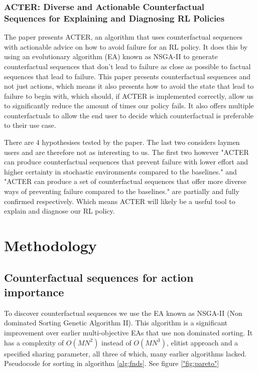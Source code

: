 \documentclass[UKenglish]{uiomasterthesis}
\begin{document}
\subsection{ ACTER: Diverse and Actionable Counterfactual\\ Sequences for Explaining and Diagnosing RL Policies}
\label{sec:acter}
The paper presents ACTER, an algorithm that uses counterfactual sequences with actionable advice on how to avoid failure for an RL policy. It does this by using an evolutionary algorithm (EA) known as NSGA-II to generate counterfactual sequences that don't lead to failure as close as possible to factual sequences that lead to failure. This paper presents counterfactual sequences and not just actions, which means it also presents how to avoid the state that lead to failure to begin with, which should, if ACTER is implemented correctly, allow us to significantly reduce the amount of times our policy fails. It also offers multiple counterfactuals to allow the end user to decide which counterfactual is preferable to their use case.

There are 4 hypothesises tested by the paper. The last two considers laymen users and are therefore not as interesting to us. The first two however "ACTER can produce counterfactual sequences that prevent failure with lower effort and higher certainty in stochastic environments compared to the baselines." and "ACTER can produce a set of counterfactual sequences that offer more diverse ways of preventing failure compared to the baselines." are partially and fully confirmed respectively. Which means ACTER will likely be a useful tool to explain and diagnose our RL policy.


\medskip
\chapter{Methodology}

\section{Counterfactual sequences for action importance}
\label{sec:counterfactual}
To discover counterfactual sequences we use the EA known as NSGA-II (Non dominated Sorting Genetic Algorithm II). This algorithm is a significant improvement over earlier multi-objective EAs that use non dominated sorting. It has a complexity of $O(MN^2)$ instead of $O(MN^3)$, elitist approach and a specified sharing parameter, all three of which, many earlier algorithms lacked. \cite{Deb2001AFA} Pseudocode for sorting in algorithm \ref{alg:fnds}. See figure \ref{"fig:pareto"}
\end{document}
